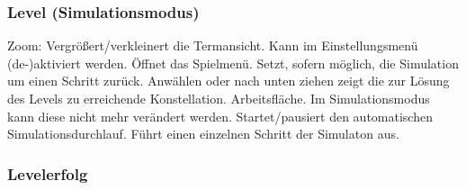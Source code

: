 \subsubsection{Level (Simulationsmodus)}

\begin{center}
\setlength\fboxsep{20pt}
\setlength\fboxrule{1pt}
\end{center}

\begin{requirements}
 Zoom: Vergrößert/verkleinert die Termansicht. Kann im Einstellungsmenü (de-)aktiviert werden.
 Öffnet das Spielmenü.
 Setzt, sofern möglich, die Simulation um einen Schritt zurück.
 Anwählen oder nach unten ziehen zeigt die zur Lösung des Levels zu erreichende Konstellation.
 Arbeitsfläche. Im Simulationsmodus kann diese nicht mehr verändert werden.
 Startet/pausiert den automatischen Simulationsdurchlauf.
 Führt einen einzelnen Schritt der Simulaton aus.
\end{requirements}

\subsubsection{Levelerfolg}

\begin{center}
\setlength\fboxsep{20pt}
\setlength\fboxrule{1pt}
\end{center}

